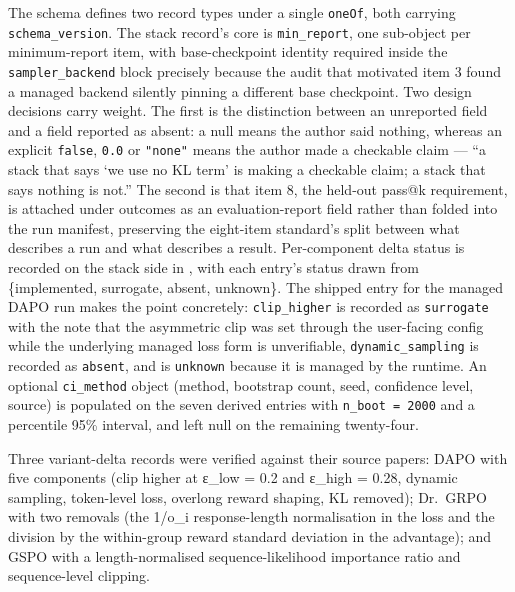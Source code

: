 \documentclass[12pt,a4paper]{report}
\DeclareRobustCommand{\longtok}[1]{\texttt{\seqsplit{#1}}}
\begin{document}
The schema defines two record types under a single \texttt{oneOf}, both
carrying \texttt{schema\_version}. The stack record's core is
\texttt{min\_report}, one sub-object per minimum-report item, with
base-checkpoint identity required inside the \texttt{sampler\_backend}
block precisely because the audit that motivated item 3 found a managed
backend silently pinning a different base checkpoint. Two design
decisions carry weight. The first is the distinction between an
unreported field and a field reported as absent: a null means the author
said nothing, whereas an explicit \texttt{false}, \texttt{0.0} or
\texttt{"none"} means the author made a checkable claim --- ``a stack
that says `we use no KL term' is making a checkable claim; a stack that
says nothing is not.'' The second is that item 8, the held-out pass@k
requirement, is attached under outcomes as an evaluation-report field
rather than folded into the run manifest, preserving the eight-item
standard's split between what describes a run and what describes a
result. Per-component delta status is recorded on the stack side in
\longtok{variant\_\allowbreak{}deltas\_\allowbreak{}applied}, with each entry's status drawn from
\{implemented, surrogate, absent, unknown\}. The shipped entry for the
managed DAPO run makes the point concretely: \texttt{clip\_higher} is
recorded as \texttt{surrogate} with the note that the asymmetric clip
was set through the user-facing config while the underlying managed loss
form is unverifiable, \texttt{dynamic\_sampling} is recorded as
\texttt{absent}, and \longtok{token\_\allowbreak{}level\_\allowbreak{}loss} is \texttt{unknown}
because it is managed by the runtime. An optional \texttt{ci\_method}
object (method, bootstrap count, seed, confidence level, source) is
populated on the seven derived entries with \texttt{n\_boot\ =\ 2000}
and a percentile 95\% interval, and left null on the remaining
twenty-four.

Three variant-delta records were verified against their source papers:
DAPO with five components (clip higher at ε\_low = 0.2 and ε\_high =
0.28, dynamic sampling, token-level loss, overlong reward shaping, KL
removed); Dr.~GRPO with two removals (the 1/\textbar o\_i\textbar{}
response-length normalisation in the loss and the division by the
within-group reward standard deviation in the advantage); and GSPO with
a length-normalised sequence-likelihood importance ratio and
sequence-level clipping.
\end{document}
